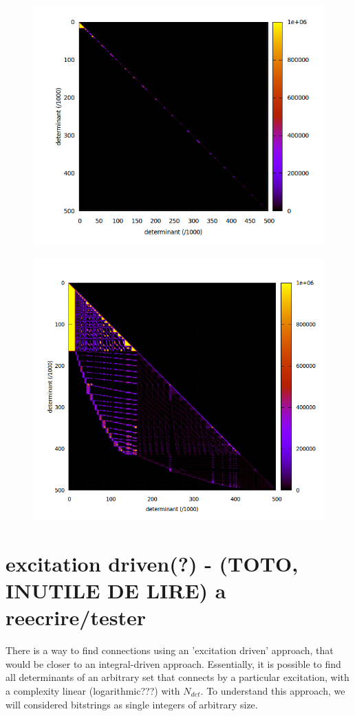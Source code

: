 \documentclass[./thesis.tex]{subfiles}
\begin{document}
    
   
\begin{figure}[H]
	\begin{center}
		\includegraphics[width=0.6\columnwidth]{figures/davidson/aabb_subspace}
		\caption{{\label{fig:aabb_subspace}
		}}
	\end{center}
\end{figure}

\begin{figure}[H]
	\begin{center}
		\includegraphics[width=0.55\columnwidth]{figures/davidson/ab_subspace}
		\caption{{\label{fig:ab_subspace}
		}}
	\end{center}
\end{figure}

\section{excitation driven(?) - (TOTO, INUTILE DE LIRE) a reecrire/tester}

There is a way to find connections using an 'excitation driven' approach, that would be closer to an integral-driven approach. Essentially, it is possible to find all determinants of an arbitrary set that connects by a particular excitation, with a complexity linear (logarithmic???) with $N_{det}$.
To understand this approach, we will considered bitstrings as single integers of arbitrary size.
\end{document}
